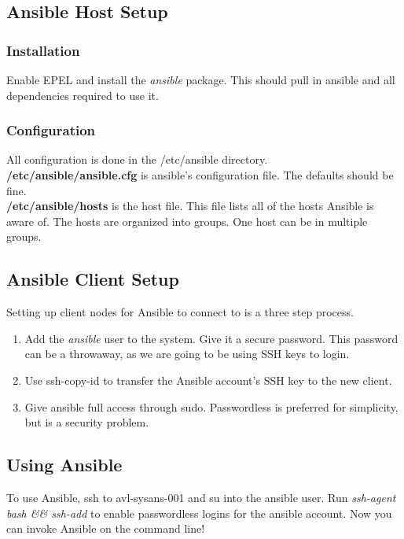 \documentclass[a4paper]{article}
\begin{document}
\subsection{Ansible Host Setup}
\subsubsection{Installation}
Enable EPEL and install the \textit{ansible} package. This should pull in ansible and all dependencies required to use it.
\subsubsection{Configuration}
All configuration is done in the /etc/ansible directory. \\
\textbf{/etc/ansible/ansible.cfg} is ansible's configuration file. The defaults should be fine.\\
\textbf{/etc/ansible/hosts} is the host file. This file lists all of the hosts Ansible is aware of. The hosts are organized into groups. One host can be in multiple groups.

\subsection{Ansible Client Setup}

Setting up client nodes for Ansible to connect to is a three step process.

\begin{enumerate}
	\item Add the \textit{ansible} user to the system. Give it a secure password. This password can be a throwaway, as we are going to be using SSH keys to login.
    \item Use ssh-copy-id to transfer the Ansible account's SSH key to the new client.
    \item Give ansible full access through sudo. Passwordless is preferred for simplicity, but is a security problem.
\end{enumerate}

\subsection{Using Ansible}

To use Ansible, ssh to avl-sysans-001 and su into the ansible user. Run \textit{ssh-agent bash \&\& ssh-add} to enable passwordless logins for the ansible account. Now you can invoke Ansible on the command line!
\end{document}
